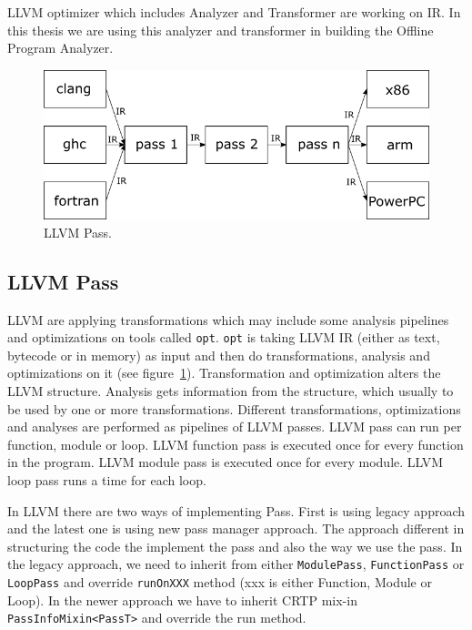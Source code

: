 LLVM optimizer \textemdash{} which includes Analyzer and Transformer \textemdash{} are working on IR. In this thesis we are using this analyzer and transformer in building the Offline Program Analyzer.

\begin{figure}[htbp] 
    \centerline{\includegraphics[scale=.75]{Figures/03/llvm-overview.png}} 
    \caption{LLVM Pass.} 
    \label{fig:llvm} 
\end{figure} 

\subsection{LLVM Pass}

LLVM are applying transformations \textemdash{} which may include some analysis
pipelines \textemdash{} and optimizations on tools called \texttt{opt}.
\texttt{opt} is taking LLVM IR (either as text, bytecode or in memory) as input
and then do transformations, analysis and optimizations on it (see
figure~\ref{fig:llvm}). Transformation and optimization alters the LLVM
structure. Analysis gets information from the structure, which usually to be
used by one or more transformations. Different transformations, optimizations
and analyses are performed as pipelines of LLVM passes. LLVM pass can run per
function, module or loop. LLVM function pass is executed once for every function
in the program. LLVM module pass is executed once for every module. LLVM loop
pass runs a time for each loop.  


In LLVM there are two ways of implementing Pass. First is using legacy approach
and the latest one is using new pass manager approach. The approach different in
structuring the code the implement the pass and also the way we use the pass.
In the legacy approach, we need to inherit from either \texttt{ModulePass},
\texttt{FunctionPass} or \texttt{LoopPass} and override \texttt{runOnXXX} method
(xxx is either Function, Module or Loop). In the newer approach we have to
inherit CRTP mix-in \texttt{PassInfoMixin<PassT>} and override the run method.

